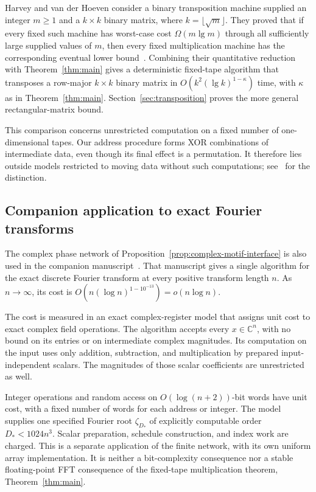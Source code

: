 \documentclass[11pt]{article}
\theoremstyle{definition}
\begin{document}
Harvey and van der Hoeven consider a binary transposition machine
supplied an integer $m\ge1$ and a $k\times k$ binary matrix, where
$k=\lfloor\sqrt m\rfloor$. They proved that if every fixed such machine
has worst-case cost $\Omega(m\lg m)$ through all sufficiently large
supplied values of $m$, then every fixed multiplication machine has the
corresponding eventual lower bound~\cite[Theorem~1.2]{HarveyHoeven2025}.
Combining their quantitative reduction~\cite[Corollary~6.2]{HarveyHoeven2025}
with Theorem~\ref{thm:main} gives a deterministic fixed-tape algorithm
that transposes a row-major $k\times k$ binary matrix in
$O(k^2(\lg k)^{1-\kappa})$ time, with $\kappa$ as in
Theorem~\ref{thm:main}. Section~\ref{sec:transposition} proves the more
general rectangular-matrix bound.

This comparison concerns unrestricted computation on a fixed number of
one-dimensional tapes. Our address procedure forms XOR combinations of
intermediate data, even though its final effect is a permutation.
It therefore lies outside models restricted to moving data without such
computations; see~\cite[Section~1.4]{HarveyHoeven2025} for the distinction.

\subsection{Companion application to exact Fourier transforms}

The complex phase network of Proposition~\ref{prop:complex-motif-interface}
is also used in the companion manuscript~\cite[Section~1.1, Theorem~1.1
and Corollary~1.2]{OpenAIExactDFT2026}. That manuscript gives a single
algorithm for the exact discrete Fourier transform at every positive
transform length $n$. As $n\to\infty$, its cost is
$O(n(\log n)^{1-10^{-13}})=o(n\log n)$.

The cost is measured in an exact complex-register model that assigns unit
cost to exact complex field operations. The algorithm accepts every
$x\in\mathbb C^n$, with no bound on its entries or on intermediate complex
magnitudes. Its computation on the input uses only addition, subtraction,
and multiplication by prepared input-independent scalars. The magnitudes
of those scalar coefficients are unrestricted as well.

Integer operations and random access on $O(\log(n+2))$-bit words have unit
cost, with a fixed number of words for each address or integer. The model
supplies one specified Fourier root $\zeta_{D_*}$ of explicitly computable
order $D_*<1024n^3$. Scalar preparation, schedule construction, and index
work are charged. This is a separate application of the finite network,
with its own uniform array implementation. It is neither a bit-complexity
consequence nor a stable floating-point FFT consequence of the fixed-tape
multiplication theorem, Theorem~\ref{thm:main}.
\end{document}
